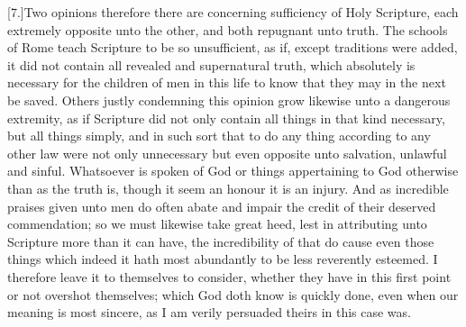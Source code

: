 [7.]Two opinions therefore there are concerning sufficiency of Holy Scripture, each extremely opposite unto the other, and both repugnant unto truth. The schools of Rome teach  Scripture to be so unsufficient, as if, except traditions were added, it did not contain all revealed and supernatural truth, which absolutely is necessary for the children of men in this life to know that they may in the next be saved. Others justly condemning this opinion grow likewise unto a dangerous extremity, as if Scripture did not only contain all things in that kind necessary, but all things simply, and in such sort that to do any thing according to any other law were not only unnecessary but even opposite unto salvation, unlawful and sinful. Whatsoever is spoken of God or things appertaining to God otherwise than as the truth is, though it seem an honour it is an injury. And as incredible praises given unto men do often abate and impair the credit of their deserved commendation; so we must likewise take great heed, lest in attributing unto Scripture more than it can have, the incredibility of that do cause even those things which indeed it hath most abundantly to be less reverently esteemed. I therefore leave it to themselves to consider, whether they have in this first point or not overshot themselves; which God doth know is quickly done, even when our meaning is most sincere, as I am verily persuaded theirs in this case was.


